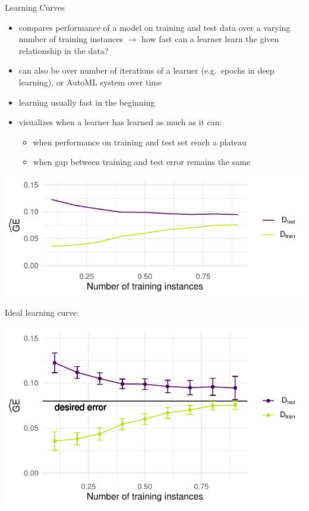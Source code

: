     \begin{frame}[c,allowframebreaks]{Learning Curves}

    \begin{itemize}
    \item compares performance of a model on training and test data over a varying number of training instances $\rightarrow$ how fast can a learner learn the given relationship in the data?
    \item can also be over number of iterations of a learner (e.g.\ epochs in
        deep learning), or AutoML system over time
    \item learning usually fast in the beginning
    \item visualizes when a learner has learned as much as it can:
    \begin{itemize}
    \item when performance on training and test set reach a plateau
    \item when gap between training and test error remains the same
    \end{itemize}
    \end{itemize}

    \begin{center}
    \includegraphics[height=.35\textheight]{learning-curve}
    \end{center}

    \framebreak

    Ideal learning curve:

    \begin{center}
    \includegraphics[height=.7\textheight]{learning-curve-ideal}
    \end{center}


\end{frame}
